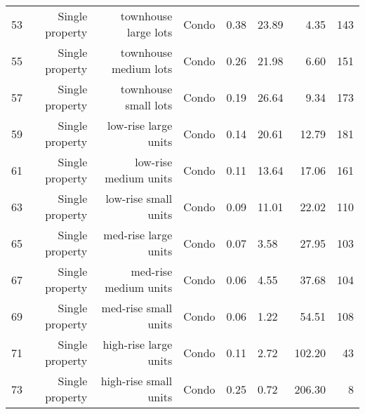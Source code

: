 \begin{tabular}{ p{0.5in} r r p{1in} p{0.75in} p{0.75in} rr}
        53 & Single property & townhouse large lots & Condo &       0.38 &      23.89 &       4.35 &        143 \\

        55 & Single property & townhouse medium lots & Condo &       0.26 &      21.98 &       6.60 &        151 \\

        57 & Single property & townhouse small lots & Condo &       0.19 &      26.64 &       9.34 &        173 \\

        59 & Single property & low-rise large units & Condo &       0.14 &      20.61 &      12.79 &        181 \\

        61 & Single property & low-rise medium units & Condo &       0.11 &      13.64 &      17.06 &        161 \\

        63 & Single property & low-rise small units & Condo &       0.09 &      11.01 &      22.02 &        110 \\

        65 & Single property & med-rise large units & Condo &       0.07 &       3.58 &      27.95 &        103 \\

        67 & Single property & med-rise medium units & Condo &       0.06 &       4.55 &      37.68 &        104 \\

        69 & Single property & med-rise small units & Condo &       0.06 &       1.22 &      54.51 &        108 \\

        71 & Single property & high-rise large units & Condo &       0.11 &       2.72 &     102.20 &         43 \\

        73 & Single property & high-rise small units & Condo &       0.25 &       0.72 &     206.30 &          8 \\





\end{tabular}
